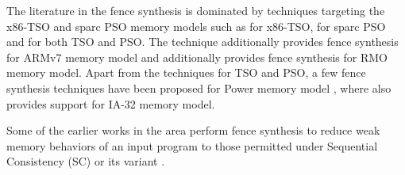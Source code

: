 The literature in the  fence synthesis is dominated by 
techniques targeting the x86-TSO and sparc PSO memory models
such as \cite{abdulla2012counter,alglave2010fences,alglave2014don,linden2011verification,abdulla2012automatic,abdulla2015best,bender2015declarative} 
for x86-TSO,
\cite{abdulla2015precise,linden2013verification} 
for sparc PSO and \cite{liu2012dynamic,meshman2014synthesis,abdulla2013memorax,joshi2015property,kuperstein2012automatic}
for both TSO and PSO.
%
The technique \cite{bender2015declarative} additionally
provides fence synthesis for ARMv7 memory model and 
\cite{kuperstein2012automatic} additionally provides
fence synthesis for RMO memory model.
%
Apart from the techniques for TSO and PSO, a few 
fence synthesis techniques have been proposed for Power
memory model 
\cite{alglave2010fences,abdulla2015precise,fang2003automatic}, 
where \cite{fang2003automatic} also 
provides support for IA-32 memory model.

Some of the earlier works in the area 
\cite{alglave2010fences,abdulla2015precise,fang2003automatic} 
perform fence synthesis to reduce weak memory behaviors of an 
input program to those permitted under Sequential Consistency (SC)
or its variant \cite{abdulla2015best}.
%
